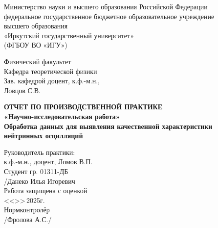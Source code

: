 \documentclass[a4paper,12pt]{article}
\begin{document}
\onehalfspacing
\pagestyle{plain}

\begin{titlepage}
	\begin{center}%
		Министерство науки и высшего образования Российской Федерации\\
		федеральное государственное бюджетное образовательное учреждение\\
		высшего образования \\
		«Иркутский государственный университет»\\
		(ФГБОУ ВО «ИГУ»)\\
	\end{center}
	\vspace*{3em}
	
	\begin{flushright}
		\begin{minipage}{92mm}
			Физический факультет\\
			Кафедра теоретической физики\\
			Зав. кафедрой доцент, к.ф.-м.н.,\\
			Ловцов С.В.\;\underline{\hspace{35mm}}
		\end{minipage}
	\end{flushright}
	\vspace*{4em}
	
	\begin{center}
		\large
		\bfseries%
		ОТЧЕТ ПО ПРОИЗВОДСТВЕННОЙ ПРАКТИКЕ\\
		«Научно-исследовательская работа»\\[2ex]
		
		\Large
		Обработка данных для выявления качественной характеристики нейтринных осцилляций
	\end{center}
	
	\vspace*{3em}
	
	\begin{flushright}
		\begin{minipage}{95mm}
			Руководитель практики:
			\underline{\hspace{35mm}}\\
			к.ф.-м.н., доцент, Ломов В.П.\\[3ex]
			Студент гр. 01311-ДБ\\
			\underline{\hspace{35mm}}/Данеко Илья Игоревич\\[3ex]
			Работа защищена с оценкой \underline{\hspace{30mm}}\\
			<<\underline{\hspace{8mm}}>>\underline{\hspace{22mm}}\,2025г.\\
			Нормконтролёр\\
			\underline{\hspace{35mm}}/Фролова А.С./\\
		\end{minipage}
	\end{flushright}
	

\end{titlepage}
\end{document}
